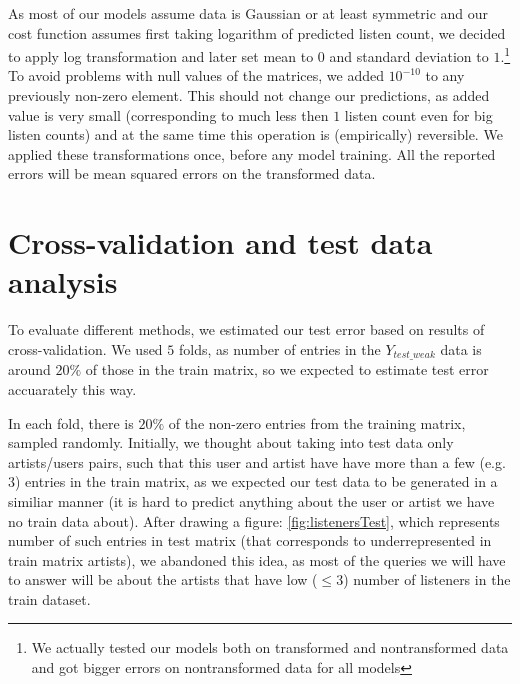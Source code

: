\documentclass{report}
\begin{document}
As most of our models assume data is Gaussian or at least symmetric and our cost function assumes first taking logarithm of predicted listen count, we decided to apply log transformation and later set mean to $0$ and standard deviation to $1$.\footnote{We actually tested our models both on transformed and nontransformed data and got bigger errors on nontransformed data for all models} To avoid problems with null values of the matrices, we added $10^{-10}$ to any previously non-zero element. This should not change our predictions, as added value is very small (corresponding to much less then $1$ listen count even for big listen counts) and at the same time this operation is (empirically) reversible. We applied these transformations once, before any model training. All the reported errors will be mean squared errors on the transformed data.
\section{Cross-validation and test data analysis}
To evaluate different methods, we estimated our test error based on results of cross-validation. We used $5$ folds, as number of entries in the $Y_{test\_weak}$ data is around $20\%$ of those in the train matrix, so we expected to estimate test error accuarately this way.

In each fold, there is $20\%$ of the non-zero entries from the training matrix, sampled randomly. Initially, we thought about taking into test data only artists/users pairs, such that this user and artist have have more than a few (e.g. $3$) entries in the train matrix, as we expected our test data to be generated in a similiar manner (it is hard to predict anything about the user or artist we have no train data about). After drawing a figure: \ref{fig:listenersTest}, which represents number of such entries in test matrix (that corresponds to underrepresented in train matrix artists), we abandoned this idea, as most of the queries we will have to answer will be about the artists that have low ($\le 3$) number of listeners in the train dataset.
\end{document}
